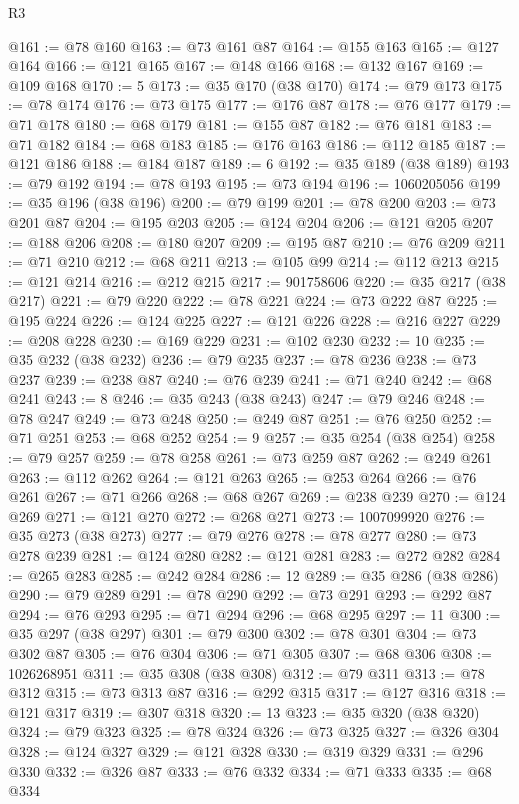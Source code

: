 \begin{lexlean}{R3}
\begin{coremodule}
@161 := @78 @160
@163 := @73 @161 @87
@164 := @155 @163
@165 := @127 @164
@166 := @121 @165
@167 := @148 @166
@168 := @132 @167
@169 := @109 @168
@170 := 5
@173 := @35 @170 (@38 @170)
@174 := @79 @173
@175 := @78 @174
@176 := @73 @175
@177 := @176 @87
@178 := @76 @177
@179 := @71 @178
@180 := @68 @179
@181 := @155 @87
@182 := @76 @181
@183 := @71 @182
@184 := @68 @183
@185 := @176 @163
@186 := @112 @185
@187 := @121 @186
@188 := @184 @187
@189 := 6
@192 := @35 @189 (@38 @189)
@193 := @79 @192
@194 := @78 @193
@195 := @73 @194
@196 := 1060205056
@199 := @35 @196 (@38 @196)
@200 := @79 @199
@201 := @78 @200
@203 := @73 @201 @87
@204 := @195 @203
@205 := @124 @204
@206 := @121 @205
@207 := @188 @206
@208 := @180 @207
@209 := @195 @87
@210 := @76 @209
@211 := @71 @210
@212 := @68 @211
@213 := @105 @99
@214 := @112 @213
@215 := @121 @214
@216 := @212 @215
@217 := 901758606
@220 := @35 @217 (@38 @217)
@221 := @79 @220
@222 := @78 @221
@224 := @73 @222 @87
@225 := @195 @224
@226 := @124 @225
@227 := @121 @226
@228 := @216 @227
@229 := @208 @228
@230 := @169 @229
@231 := @102 @230
@232 := 10
@235 := @35 @232 (@38 @232)
@236 := @79 @235
@237 := @78 @236
@238 := @73 @237
@239 := @238 @87
@240 := @76 @239
@241 := @71 @240
@242 := @68 @241
@243 := 8
@246 := @35 @243 (@38 @243)
@247 := @79 @246
@248 := @78 @247
@249 := @73 @248
@250 := @249 @87
@251 := @76 @250
@252 := @71 @251
@253 := @68 @252
@254 := 9
@257 := @35 @254 (@38 @254)
@258 := @79 @257
@259 := @78 @258
@261 := @73 @259 @87
@262 := @249 @261
@263 := @112 @262
@264 := @121 @263
@265 := @253 @264
@266 := @76 @261
@267 := @71 @266
@268 := @68 @267
@269 := @238 @239
@270 := @124 @269
@271 := @121 @270
@272 := @268 @271
@273 := 1007099920
@276 := @35 @273 (@38 @273)
@277 := @79 @276
@278 := @78 @277
@280 := @73 @278 @239
@281 := @124 @280
@282 := @121 @281
@283 := @272 @282
@284 := @265 @283
@285 := @242 @284
@286 := 12
@289 := @35 @286 (@38 @286)
@290 := @79 @289
@291 := @78 @290
@292 := @73 @291
@293 := @292 @87
@294 := @76 @293
@295 := @71 @294
@296 := @68 @295
@297 := 11
@300 := @35 @297 (@38 @297)
@301 := @79 @300
@302 := @78 @301
@304 := @73 @302 @87
@305 := @76 @304
@306 := @71 @305
@307 := @68 @306
@308 := 1026268951
@311 := @35 @308 (@38 @308)
@312 := @79 @311
@313 := @78 @312
@315 := @73 @313 @87
@316 := @292 @315
@317 := @127 @316
@318 := @121 @317
@319 := @307 @318
@320 := 13
@323 := @35 @320 (@38 @320)
@324 := @79 @323
@325 := @78 @324
@326 := @73 @325
@327 := @326 @304
@328 := @124 @327
@329 := @121 @328
@330 := @319 @329
@331 := @296 @330
@332 := @326 @87
@333 := @76 @332
@334 := @71 @333
@335 := @68 @334

\end{coremodule}
\end{lexlean}
